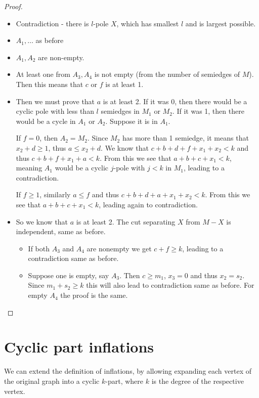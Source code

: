 \documentclass[12pt, twoside]{book}
\begin{document}
\begin{proof}
	\begin{itemize}
		\item Contradiction - there is $l$-pole $X$, which has smallest $l$ and is largest possible.
		\item $A_1,\dots$ as before
		\item $A_1,A_2$ are non-empty.
		\item At least one from $A_3,A_4$ is not empty (from the number of semiedges of $M$). Then this means that $c$ or $f$ is at least 1.
		\item Then we must prove that $a$ is at least 2. If it was 0, then there would be a cyclic pole with less than $l$ semiedges in $M_1$ or $M_2$. If it was 1, then there would be a cycle in $A_1$ or $A_2$. Suppose it is in $A_1$. 
		
		If $f=0$, then $A_2=M_2$. Since $M_2$ has more than 1 semiedge, it means that $x_2+d\geq 1$, thus $a\leq x_2+d$. We know that $c+b+d+f+x_1+x_2<k$ and thus  $c+b+f+x_1+a<k$. From this we see that $a+b+c+x_1<k$, meaning $A_1$ would be a cyclic $j$-pole with $j<k$ in $M_1$, leading to a contradiction.
		
		If $f\geq 1$, similarly $a\leq f$ and thus $c+b+d+a+x_1+x_2<k$. From this we see that $a+b+c+x_1<k$, leading again to contradiction.
		\item So we know that $a$ is at least 2. The cut separating $X$ from $M-X$ is independent, same as before.
		\begin{itemize}
			\item If both $A_3$ and $A_4$ are nonempty we get $c+f\geq k$, leading to a contradiction same as before.
			\item Suppose one is empty, say $A_3$. Then $c\geq m_1$, $x_3=0$ and thus $x_2=s_2$. Since $m_1+s_2\geq k$ this will also lead to contradiction same as before. For empty $A_4$ the proof is the same.
		\end{itemize}
	\end{itemize}
\end{proof}

\section{Cyclic part inflations}\label{sec:cyclic-part-inflations}

We can extend the definition of inflations, by allowing expanding each vertex of the original graph into a cyclic $k$-part, where $k$ is the degree of the respective vertex.
\end{document}
